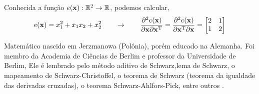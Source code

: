 \begin{example}
Conhecida a função $e(\VECTOR{x}): \mathbb{R}^2 \rightarrow \mathbb{R}$, podemos calcular,
\begin{equation}
e(\VECTOR{x})=x_1^2+x_1 x_2+x_2^2
\qquad \rightarrow \qquad
\frac{\partial^2 e(\VECTOR{x}) }{\partial \VECTOR{x} \partial \VECTOR{x}^{\transpose}}=
\frac{\partial^2 e(\VECTOR{x}) }{\partial \VECTOR{x}^{\transpose} \partial \VECTOR{x}}=
\begin{bmatrix}
 2 & 1 \\
 1 & 2
\end{bmatrix}
\end{equation}
\end{example}

\begin{elaboracion}[title=Karl Hermann Amandus Schwarz (1843-1921), width= 0.99\linewidth]
Matemático nascido em Jerzmanowa (Polônia), porém  educado na Alemanha.
Foi membro da Academia de Ciências de Berlim e professor da Universidade de Berlim,
Ele é lembrado pelo método aditivo de Schwarz,lema de Schwarz, o mapeamento de Schwarz-Christoffel, 
o teorema de Schwarz (teorema da igualdade das derivadas cruzadas), o teorema Schwarz-Ahlfors-Pick, entre outros \cite[pp. 297]{agarwal2014creators}.
\end{elaboracion}

